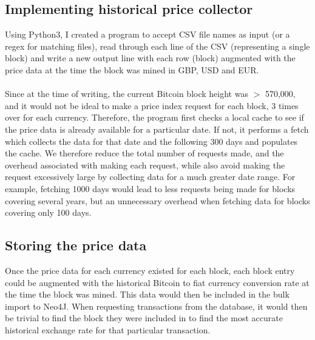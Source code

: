 \subsection{Implementing historical price collector}
Using Python3, I created a program to accept CSV file names as input (or a regex for matching files), read through each line of the CSV (representing a single block) and write a new output line with each row (block) augmented with the price data at the time the block was mined in GBP, USD and EUR. 
\\\\
Since at the time of writing, the current Bitcoin block height was $>$ 570,000, and it would not be ideal to make a price index request for each block, 3 times over for each currency. Therefore, the program first checks a local cache to see if the price data is already available for a particular date. If not, it performs a fetch which collects the data for that date and the following 300 days and populates the cache. We therefore reduce the total number of requests made, and the overhead associated with making each request, while also avoid making the request excessively large by collecting data for a much greater date range. For example, fetching 1000 days would lead to less requests being made for blocks covering several years, but an unnecessary overhead when fetching data for blocks covering only 100 days.

\subsection{Storing the price data}
Once the price data for each currency existed for each block, each block entry could be augmented with the historical Bitcoin to fiat currency conversion rate at the time the block was mined. This data would then be included in the bulk import to Neo4J. When requesting transactions from the database, it would then be trivial to find the block they were included in to find the most accurate historical exchange rate for that particular transaction. 